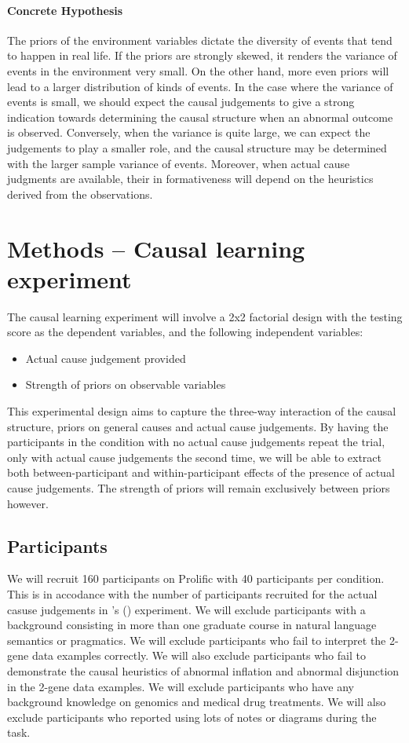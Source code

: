 \documentclass[10pt,letterpaper]{article}
\def\citeapos#1{\citeauthor{#1}'s (\citeyear{#1})}
\begin{document}
\paragraph{Concrete Hypothesis}

The priors of the environment variables dictate the diversity of events that tend to happen in real life. If the priors are strongly skewed, it renders the variance of events in the environment very small. 
On the other hand, more even priors will lead to a larger distribution of kinds of events. 
In the case where the variance of events is small, we should expect the causal judgements to give a strong indication towards determining the causal structure when an abnormal outcome is observed.
Conversely, when the variance is quite large, we can expect the judgements to
play a smaller role, and the causal structure may be determined with the larger
sample variance of events. Moreover, when actual cause judgments are available, their in formativeness will depend on the heuristics derived from the observations.

\section*{Methods -- Causal learning experiment }

The causal learning experiment will involve a 2x2 factorial design with the testing score as the dependent variables, and the following independent variables:
\begin{itemize}
  \item Actual cause judgement provided
  \item Strength of priors on observable variables
\end{itemize}
This experimental design aims to capture the three-way interaction of the causal structure, priors on general causes and actual cause judgements. By having the participants in the condition with no actual cause judgements repeat the trial, only with actual cause judgements the second time, we will be able to extract both between-participant and within-participant effects of the presence of actual cause judgements. The strength of priors will remain exclusively between priors however.

\subsection*{Participants}

We will recruit 160 participants on Prolific with 40 participants per condition.
This is in accodance with the number of participants recruited for the actual casuse judgements in \citeapos{Quillien2022} experiment.
We will exclude participants with a background consisting in more than one graduate course
in natural language semantics or pragmatics. 
We will exclude participants who fail to interpret the 2-gene data examples correctly.
We will also exclude participants who fail to demonstrate the causal heuristics of abnormal inflation and abnormal disjunction in the 2-gene data examples.
We will exclude participants who have any background knowledge on genomics and medical drug treatments.
We will also exclude participants who reported using lots of notes or diagrams during the task.
\end{document}
